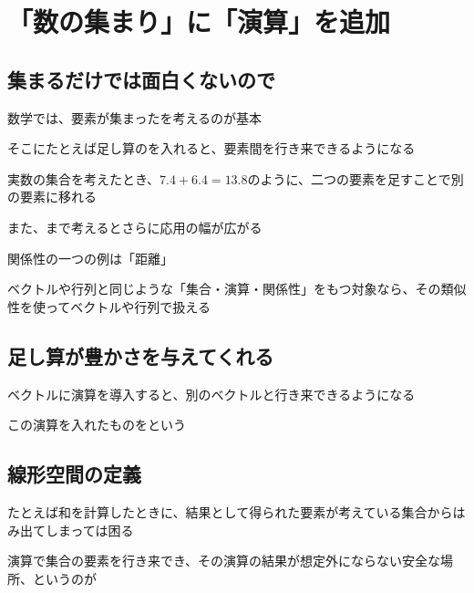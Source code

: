 \documentclass[../book_half_step_linear]{subfiles}
\begin{document}
\section{「数の集まり」に「演算」を追加}

\subsection{集まるだけでは面白くないので}

数学では、要素が集まったを考えるのが基本

\br

そこにたとえば足し算のを入れると、要素間を行き来できるようになる

実数の集合を考えたとき、$7.4+6.4=13.8$のように、二つの要素を足すことで別の要素に移れる

\br

また、まで考えるとさらに応用の幅が広がる

関係性の一つの例は「距離」

\br

ベクトルや行列と同じような「集合・演算・関係性」をもつ対象なら、その類似性を使ってベクトルや行列で扱える

\sectionline

\subsection{足し算が豊かさを与えてくれる}

ベクトルに演算を導入すると、別のベクトルと行き来できるようになる

この演算を入れたものをという

\sectionline

\subsection{線形空間の定義}

たとえば和を計算したときに、結果として得られた要素が考えている集合からはみ出てしまっては困る

演算で集合の要素を行き来でき、その演算の結果が想定外にならない安全な場所、というのが

\br
\end{document}
